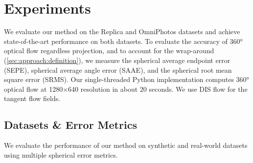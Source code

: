 \section{Experiments}
\label{sec:exp}

We evaluate our method on the Replica \cite{StrauWMCWGEMRVCYBYPYZLCBGMPSBSNGLN2019} and OmniPhotos \cite{BerteYLR2020} datasets and achieve state-of-the-art performance on both datasets.
%
To evaluate the accuracy of 360° optical flow regardless projection, and to account for the wrap-around (\cref{sec:approach:definition}), we measure the spherical average endpoint error (SEPE), spherical average angle error (SAAE), and the spherical root mean square error (SRMS).
%
Our single-threaded Python implementation computes 360° optical flow at 1280$\times$640 resolution in about 20 seconds.
We use DIS flow \cite{KroegTDV2016} for the tangent flow fields.


\subsection{Datasets \& Error Metrics}
\label{sec:datasets-metrics}

We evaluate the performance of our method on synthetic and real-world datasets using multiple spherical error metrics.


